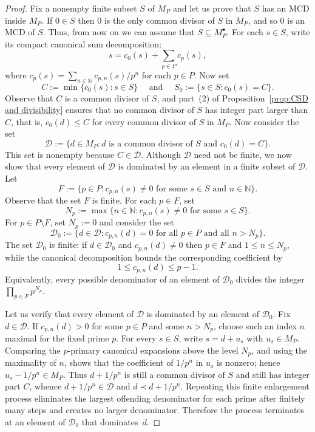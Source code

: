 \documentclass[10pt]{amsart}
\theoremstyle{definition}
\theoremstyle{remark}
\numberwithin{equation}{section}
\newcommand{\nn}{\mathbb{N}}
\begin{document}
\begin{proof}
  Fix a nonempty finite subset $S$ of $M_P$ and let us prove that $S$ has an MCD inside $M_P$. If $0 \in S$ then $0$ is the only common divisor of $S$ in $M_P$, and so $0$ is an MCD of $S$. Thus, from now on we can assume that $S \subseteq M_P^\bullet$.
  For each $s \in S$, write its compact canonical sum decomposition:
  \[
    s = c_0(s) + \sum_{p \in P} c_p(s),
  \]
  where $c_p(s) = \sum_{n \in \nn} c_{p,n}(s)/p^n$ for each $p \in P$. Now set
  \[
    C := \min\{c_0(s) : s \in S\} \quad \text{ and } \quad S_0 := \{s \in S : c_0(s) = C \}.
  \]
  Observe that $C$ is a common divisor of $S$, and part~(2) of Proposition~\ref{prop:CSD and divisibility} ensures that no common divisor of $S$ has integer part larger than $C$, that is, $c_0(d) \le C$ for every common divisor of $S$ in $M_P$. Now consider the set
  \[
    \mathcal{D} := \{d \in M_P : d \text{ is a common divisor of } S \text{ and } c_0(d)=C\}.
  \]
  This set is nonempty because $C \in \mathcal{D}$. Although $\mathcal{D}$ need not be finite, we now show that every element of $\mathcal{D}$ is dominated by an element in a finite subset of $\mathcal{D}$. Let
  \[
    F := \{p \in P : c_{p,n}(s) \ne 0 \text{ for some } s \in S \text{ and } n \in \nn\}.
  \]
  Observe that the set $F$ is finite. For each $p \in F$, set
  \[
    N_p := \max\{n \in \nn : c_{p,n}(s) \ne 0 \text{ for some } s \in S\}.
  \]
  For $p \in P \setminus F$, set $N_p:=0$ and consider the set
  \[
    \mathcal{D}_0 := \{d \in \mathcal{D} : c_{p,n}(d)=0 \text{ for all } p \in P \text{ and all } n>N_p\}.
  \]
  The set $\mathcal{D}_0$ is finite: if $d \in \mathcal{D}_0$ and $c_{p,n}(d) \ne 0$ then $p \in F$ and $1 \le n \le N_p$, while the canonical decomposition bounds the corresponding coefficient by
  \[
    1 \le c_{p,n}(d) \le p-1.
  \]
  Equivalently, every possible denominator of an element of $\mathcal{D}_0$ divides the integer $\prod_{p \in F} p^{N_p}$.

  Let us verify that every element of $\mathcal{D}$ is dominated by an element of $\mathcal{D}_0$. Fix $d \in \mathcal{D}$. If $c_{p,n}(d)>0$ for some $p \in P$ and some $n>N_p$, choose such an index $n$ maximal for the fixed prime $p$. For every $s \in S$, write $s=d+u_s$ with $u_s \in M_P$. Comparing the $p$-primary canonical expansions above the level $N_p$, and using the maximality of $n$, shows that the coefficient of $1/p^n$ in $u_s$ is nonzero; hence $u_s-1/p^n \in M_P$. Thus $d+1/p^n$ is still a common divisor of $S$ and still has integer part $C$, whence $d+1/p^n \in \mathcal{D}$ and $d \prec d+1/p^n$. Repeating this finite enlargement process eliminates the largest offending denominator for each prime after finitely many steps and creates no larger denominator. Therefore the process terminates at an element of $\mathcal{D}_0$ that dominates~$d$.


\end{proof}
\end{document}
